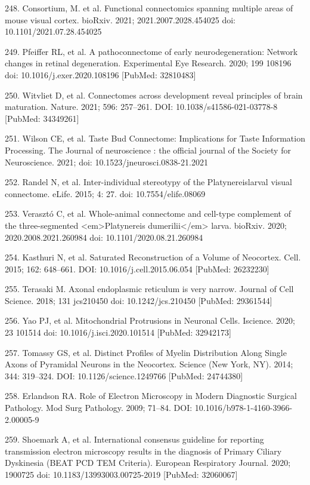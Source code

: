 \documentclass{article}
\begin{document}
\begin{hangpars}
248. Consortium, M. et al. Functional connectomics spanning multiple areas of mouse visual cortex. bioRxiv. 2021; 2021.2007.2028.454025 doi: 10.1101/2021.07.28.454025

249. Pfeiffer RL, et al. A pathoconnectome of early neurodegeneration: Network changes in retinal degeneration. Experimental Eye Research. 2020; 199 108196 doi: 10.1016/j.exer.2020.108196 [PubMed: 32810483]

250. Witvliet D, et al. Connectomes across development reveal principles of brain maturation. Nature. 2021; 596: 257–261. DOI: 10.1038/s41586-021-03778-8 [PubMed: 34349261]

251. Wilson CE, et al. Taste Bud Connectome: Implications for Taste Information Processing. The Journal of neuroscience : the official journal of the Society for Neuroscience. 2021; doi: 10.1523/jneurosci.0838-21.2021

252. Randel N, et al. Inter-individual stereotypy of the Platynereislarval visual connectome. eLife. 2015; 4: 27. doi: 10.7554/elife.08069

253. Verasztó C, et al. Whole-animal connectome and cell-type complement of the three-segmented <em>Platynereis dumerilii</em> larva. bioRxiv. 2020; 2020.2008.2021.260984 doi: 10.1101/2020.08.21.260984

254. Kasthuri N, et al. Saturated Reconstruction of a Volume of Neocortex. Cell. 2015; 162: 648–661. DOI: 10.1016/j.cell.2015.06.054 [PubMed: 26232230]

255. Terasaki M. Axonal endoplasmic reticulum is very narrow. Journal of Cell Science. 2018; 131 jcs210450 doi: 10.1242/jcs.210450 [PubMed: 29361544]

256. Yao PJ, et al. Mitochondrial Protrusions in Neuronal Cells. Iscience. 2020; 23 101514 doi: 10.1016/j.isci.2020.101514 [PubMed: 32942173]

257. Tomassy GS, et al. Distinct Profiles of Myelin Distribution Along Single Axons of Pyramidal Neurons in the Neocortex. Science (New York, NY). 2014; 344: 319–324. DOI: 10.1126/science.1249766 [PubMed: 24744380]

258. Erlandson RA. Role of Electron Microscopy in Modern Diagnostic Surgical Pathology. Mod Surg Pathology. 2009; 71–84. DOI: 10.1016/b978-1-4160-3966-2.00005-9

259. Shoemark A, et al. International consensus guideline for reporting transmission electron microscopy results in the diagnosis of Primary Ciliary Dyskinesia (BEAT PCD TEM Criteria). European Respiratory Journal. 2020; 1900725 doi: 10.1183/13993003.00725-2019 [PubMed: 32060067]


\end{hangpars}
\end{document}
